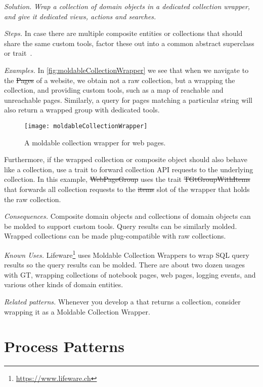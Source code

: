 \documentclass[sigconf,screen]{acmart}
\newcommand{\patref}[1]{\emph{\nameref{pat:#1}}\xspace}
\newcommand{\patsec}[1]{\noindent\textit{#1.}\xspace}
\begin{document}
\patsec{Solution}
\emph{Wrap a collection of domain objects in a dedicated collection wrapper, and give it dedicated views, actions and searches.}

\patsec{Steps}
In case there are multiple composite entities or collections that should share the same custom tools, factor these out into a common abstract superclass or trait~\cite{Duca06b}.

\patsec{Examples}
In \autoref{fig:moldableCollectionWrapper} we see that when we navigate to the \st{Pages} of a website, we obtain not a raw collection, but a  wrapping the collection, and providing custom tools, such as a map of reachable and unreachable pages.
Similarly, a query for pages matching a particular string will also return a wrapped group with dedicated tools.

\begin{figure}[h]
  \texttt{[image: moldableCollectionWrapper]}
  \caption{A moldable collection wrapper for web pages.}
  \label{fig:moldableCollectionWrapper}
\end{figure}

Furthermore, if the wrapped collection or composite object should also behave like a collection, use a trait to forward collection API requests to the underlying collection.
In this example, \st{WebPageGroup} uses the trait \st{TGtGroupWithItems} that forwards all collection requests to the \st{items} slot of the wrapper that holds the raw collection.

\patsec{Consequences}
Composite domain objects and collections of domain objects can be molded to support custom tools.
Query results can be similarly molded.\\
Wrapped collections can be made plug-compatible with raw collections.

\patsec{Known Uses}
Lifeware\footnote{\url{https://www.lifeware.ch}} uses Moldable Collection Wrappers to wrap SQL query results so the query results can be molded.
There are about two dozen usages with GT, wrapping collections of notebook pages, web pages, logging events, and various other kinds of domain entities.

\patsec{Related patterns}
Whenever you develop a \patref{CustomSearch} that returns a collection, consider wrapping it as a Moldable Collection Wrapper.

\section{Process Patterns}\label{sec:process}
\end{document}
